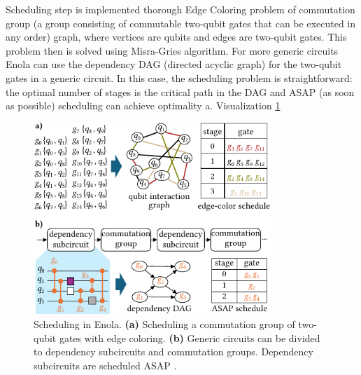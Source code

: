 Scheduling step is implemented thorough Edge Coloring problem of commutation group (a group consisting of commutable two-qubit
gates that can be executed in any order) graph, 
where vertices are qubits and edges are two-qubit gates. 
This problem then is solved using Misra-Gries algorithm.
For more generic circuits Enola can use the dependency DAG (directed acyclic graph) for the two-qubit
gates in a generic circuit. In this case, the scheduling problem is
straightforward: the optimal number of stages is the critical path
in the DAG and ASAP (as soon as possible) scheduling can achieve
optimality \parencite{Tan_2025_Enola}a. Visualization \ref{fig:scheduling_Enola}
\begin{figure}[htbp]
  \centering
    \includegraphics[width=0.8\textwidth]{figures/scheduling_Enola.pdf}
    \caption{ Scheduling in Enola. 
    \textbf{(a)} Scheduling a commutation group of two-qubit gates with edge coloring. 
    \textbf{(b)} Generic circuits can be divided to dependency subcircuits and commutation groups. 
    Dependency subcircuits are scheduled ASAP \parencite{Tan_2025_Enola}.}
    \label{fig:scheduling_Enola}
\end{figure}

